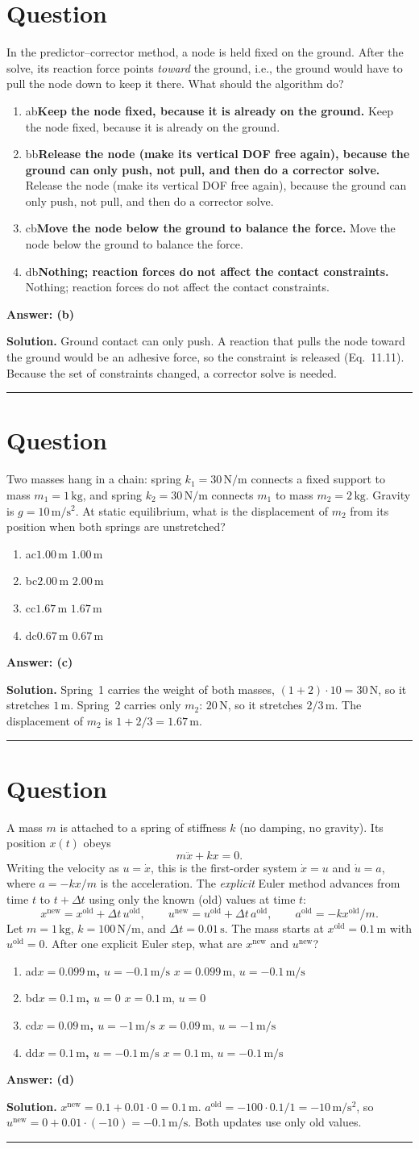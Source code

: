 \documentclass[letterpaper,11pt]{article}
\newcounter{qnum}
\newcommand{\opt}[3]{\item \if#1#2{\boldmath\textbf{#3}} \quad \textcolor{OliveGreen}{\checkmark}\else #3\fi}
\newcommand{\sol}[7]{%
  \stepcounter{qnum}%
  \section*{Question \theqnum}
  #1
  \begin{enumerate}[label=(\alph*)]
    \opt{a}{#6}{#2}
    \opt{b}{#6}{#3}
    \opt{c}{#6}{#4}
    \opt{d}{#6}{#5}
  \end{enumerate}
  \vspace{1mm}
  \textbf{Answer: (#6)}

  \textbf{Solution.} #7

  \vspace{2mm}\hrule
}
\begin{document}
%
%
\sol{In the predictor--corrector method, a node is held fixed on the ground. After the solve, its reaction force points \emph{toward} the ground, i.e., the ground would have to pull the node down to keep it there. What should the algorithm do?}
  {Keep the node fixed, because it is already on the ground.}
  {Release the node (make its vertical DOF free again), because the ground can only push, not pull, and then do a corrector solve.}
  {Move the node below the ground to balance the force.}
  {Nothing; reaction forces do not affect the contact constraints.}
  {b}
  {Ground contact can only push. A reaction that pulls the node toward the ground would be an adhesive force, so the constraint is released (Eq.~11.11). Because the set of constraints changed, a corrector solve is needed.}

%
%
\sol{Two masses hang in a chain: spring $k_1 = 30\,\mathrm{N/m}$ connects a fixed support to mass $m_1 = 1\,\mathrm{kg}$, and spring $k_2 = 30\,\mathrm{N/m}$ connects $m_1$ to mass $m_2 = 2\,\mathrm{kg}$. Gravity is $g = 10\,\mathrm{m/s^2}$. At static equilibrium, what is the displacement of $m_2$ from its position when both springs are unstretched?}
  {$1.00\,\mathrm{m}$}
  {$2.00\,\mathrm{m}$}
  {$1.67\,\mathrm{m}$}
  {$0.67\,\mathrm{m}$}
  {c}
  {Spring~1 carries the weight of both masses, $(1 + 2) \cdot 10 = 30\,\mathrm{N}$, so it stretches $1\,\mathrm{m}$. Spring~2 carries only $m_2$: $20\,\mathrm{N}$, so it stretches $2/3\,\mathrm{m}$. The displacement of $m_2$ is $1 + 2/3 = 1.67\,\mathrm{m}$.}

%
%
\sol{A mass $m$ is attached to a spring of stiffness $k$ (no damping, no gravity). Its position $x(t)$ obeys \[ m \ddot{x} + k x = 0. \] Writing the velocity as $u = \dot{x}$, this is the first-order system $\dot{x} = u$ and $\dot{u} = a$, where $a = -k x / m$ is the acceleration. The \emph{explicit} Euler method advances from time $t$ to $t + \Delta t$ using only the known (old) values at time $t$: \[ x^{\text{new}} = x^{\text{old}} + \Delta t\, u^{\text{old}}, \qquad u^{\text{new}} = u^{\text{old}} + \Delta t\, a^{\text{old}}, \qquad a^{\text{old}} = -k x^{\text{old}} / m. \] Let $m = 1\,\mathrm{kg}$, $k = 100\,\mathrm{N/m}$, and $\Delta t = 0.01\,\mathrm{s}$. The mass starts at $x^{\text{old}} = 0.1\,\mathrm{m}$ with $u^{\text{old}} = 0$. After one explicit Euler step, what are $x^{\text{new}}$ and $u^{\text{new}}$?}
  {$x = 0.099\,\mathrm{m}$, $u = -0.1\,\mathrm{m/s}$}
  {$x = 0.1\,\mathrm{m}$, $u = 0$}
  {$x = 0.09\,\mathrm{m}$, $u = -1\,\mathrm{m/s}$}
  {$x = 0.1\,\mathrm{m}$, $u = -0.1\,\mathrm{m/s}$}
  {d}
  {$x^{\text{new}} = 0.1 + 0.01 \cdot 0 = 0.1\,\mathrm{m}$. $a^{\text{old}} = -100 \cdot 0.1 / 1 = -10\,\mathrm{m/s^2}$, so $u^{\text{new}} = 0 + 0.01 \cdot (-10) = -0.1\,\mathrm{m/s}$. Both updates use only old values.}
\end{document}

